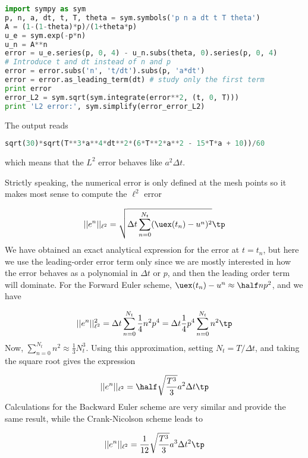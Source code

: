 \documentclass[graybox,sectrefs,envcountresetchap,open=right,final]{svmonodo}
\begin{document}
\begin{lstlisting}[language=python,style=blue1_bluegreen]
import sympy as sym
p, n, a, dt, t, T, theta = sym.symbols('p n a dt t T theta')
A = (1-(1-theta)*p)/(1+theta*p)
u_e = sym.exp(-p*n)
u_n = A**n
error = u_e.series(p, 0, 4) - u_n.subs(theta, 0).series(p, 0, 4)
# Introduce t and dt instead of n and p
error = error.subs('n', 't/dt').subs(p, 'a*dt')
error = error.as_leading_term(dt) # study only the first term
print error
error_L2 = sym.sqrt(sym.integrate(error**2, (t, 0, T)))
print 'L2 error:', sym.simplify(error_error_L2)

\end{lstlisting}

The output reads



\begin{lstlisting}[language=Python,style=gray]
sqrt(30)*sqrt(T**3*a**4*dt**2*(6*T**2*a**2 - 15*T*a + 10))/60

\end{lstlisting}

which means that the $L^2$ error behaves like $a^2\Delta t$.

Strictly speaking, the numerical error is only defined at the
mesh points so it makes most sense to compute the
$\ell^2$ error

\[ ||e^n||_{\ell^2} = \sqrt{\Delta t\sum_{n=0}^{N_t} ({\uex}(t_n) - u^n)^2}
\tp \]
We have obtained an exact analytical expression for the error at
$t=t_n$, but here we use the leading-order error term only since we
are mostly interested in how the error behaves as a polynomial in
$\Delta t$ or $p$, and then the leading order term will dominate.  For
the Forward Euler scheme, $\uex(t_n) - u^n \approx {\half}np^2$, and
we have

\[
||e^n||_{\ell^2}^2 = \Delta t\sum_{n=0}^{N_t} \frac{1}{4}n^2p^4
=\Delta t\frac{1}{4}p^4 \sum_{n=0}^{N_t} n^2\tp
\]
Now, $\sum_{n=0}^{N_t} n^2\approx \frac{1}{3}N_t^3$. Using this approximation,
setting $N_t =T/\Delta t$, and taking the square root gives the expression

\begin{equation}
||e^n||_{\ell^2} = \half\sqrt{\frac{T^3}{3}} a^2\Delta t\tp
\label{decay:analysis:gobal:error_int:FE}
\end{equation}
Calculations for the Backward Euler scheme are very similar and provide
the same result, while the Crank-Nicolson scheme leads to

\begin{equation}
||e^n||_{\ell^2} = \frac{1}{12}\sqrt{\frac{T^3}{3}}a^3\Delta t^2\tp
\label{decay:analysis:gobal:error_int:CN}
\end{equation}
\end{document}
